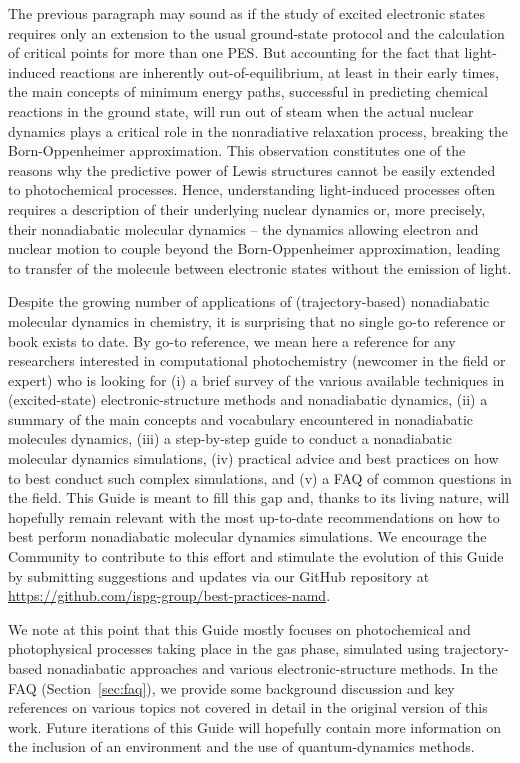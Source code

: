 \documentclass[9pt,bestpractices]{livecoms}
\newcommand{\githubrepository}{\url{https://github.com/ispg-group/best-practices-namd}}  %
\begin{document}
The previous paragraph may sound as if the study of excited electronic states requires only an extension to the usual ground-state protocol and the calculation of critical points for more than one PES. But accounting for the fact that light-induced reactions are inherently out-of-equilibrium, at least in their early times, the main concepts of minimum energy paths, successful in predicting chemical reactions in the ground state, will run out of steam when the actual nuclear dynamics plays a critical role in the nonradiative relaxation process, breaking the Born-Oppenheimer approximation.\cite{levine2007isomerization} This observation constitutes one of the reasons why the predictive power of Lewis structures cannot be easily extended to photochemical processes. Hence, understanding light-induced processes often requires a description of their underlying nuclear dynamics or, more precisely, their nonadiabatic molecular dynamics -- the dynamics allowing electron and nuclear motion to couple beyond the Born-Oppenheimer approximation, leading to transfer of the molecule between electronic states without the emission of light.

Despite the growing number of applications of (trajectory-based) nonadiabatic molecular dynamics in chemistry, it is surprising that no single go-to reference or book exists to date. By go-to reference, we mean here a reference for any researchers interested in computational photochemistry (newcomer in the field or expert) who is looking for (i) a brief survey of the various available techniques in (excited-state) electronic-structure methods and nonadiabatic dynamics, (ii) a summary of the main concepts and vocabulary encountered in nonadiabatic molecules dynamics, (iii) a step-by-step guide to conduct a nonadiabatic molecular dynamics simulations, (iv) practical advice and best practices on how to best conduct such complex simulations, and (v) a FAQ of common questions in the field. This Guide is meant to fill this gap and, thanks to its living nature, will hopefully remain relevant with the most up-to-date recommendations on how to best perform nonadiabatic molecular dynamics simulations. We encourage the Community to contribute to this effort and stimulate the evolution of this Guide by submitting suggestions and updates via our GitHub repository at \githubrepository.

We note at this point that this Guide mostly focuses on photochemical and photophysical processes taking place in the gas phase, simulated using trajectory-based nonadiabatic approaches and various electronic-structure methods. In the FAQ (Section~\ref{sec:faq}), we provide some background discussion and key references on various topics not covered in detail in the original version of this work. Future iterations of this Guide will hopefully contain more information on the inclusion of an environment and the use of quantum-dynamics methods. 
\end{document}
